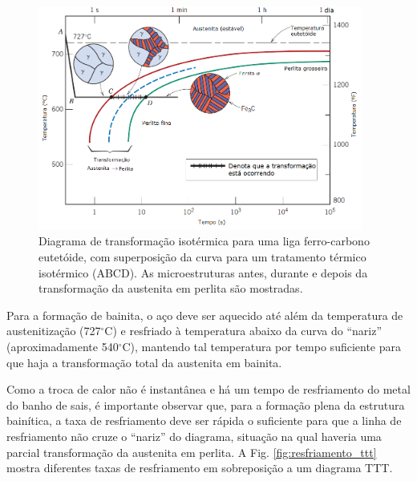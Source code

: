 \documentclass[
12pt,
openany, %
oneside, %
a4paper,			
english,			
brazil			        %
]{abntbibufjf}
\begin{document}
	\begin{figure}[H]
		\centering
		\includegraphics[width=0.95\textwidth]{formacao_perlita}
		\caption{Diagrama de transformação isotérmica para uma liga ferro-carbono eutetóide, com superposição da curva para um tratamento térmico isotérmico (ABCD). As microestruturas antes, durante e depois da transformação da austenita em perlita são mostradas. \cite{callister2011materials}}
		\label{fig:formacao_perlita}
	\end{figure}
	
	Para a formação de bainita, o aço deve ser aquecido até além da temperatura de austenitização (727$^\circ$C) e resfriado à temperatura abaixo da curva do ``nariz'' (aproximadamente 540$^\circ$C), mantendo tal temperatura por tempo suficiente para que haja a transformação total da austenita em bainita. 
	
	Como a troca de calor não é instantânea e há um tempo de resfriamento do metal do banho de sais, é importante observar que, para a formação plena da estrutura bainítica, a taxa de resfriamento deve ser rápida o suficiente para que a linha de resfriamento não cruze o ``nariz'' do diagrama, situação na qual haveria uma parcial transformação da austenita em perlita. A Fig. \ref{fig:resfriamento_ttt} mostra diferentes taxas de resfriamento em sobreposição a um diagrama TTT.
	
\end{document}
